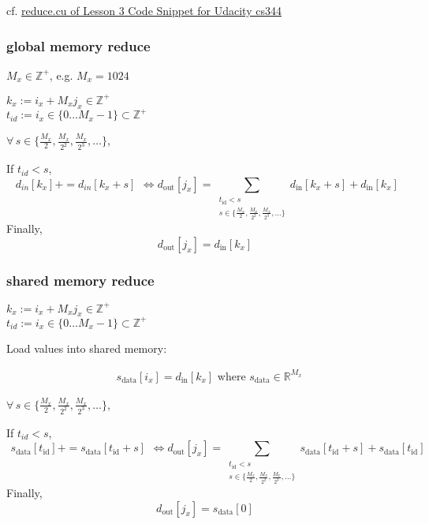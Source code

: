 \documentclass[10pt]{amsart}
\begin{document}
\begin{multicols*}{2}
cf. \href{https://github.com/udacity/cs344/blob/master/Lesson Code Snippets/Lesson 3 Code Snippets/reduce.cu}{reduce.cu of Lesson 3 Code Snippet for Udacity cs344}


\subsubsection*{global memory reduce}

$M_x \in \mathbb{Z}^+$, e.g. $M_x = 1024$

$k_x := i_x + M_x j_x \in \mathbb{Z}^+$ \\
$t_{id} := i_x \in \lbrace 0 \dots M_x-1\rbrace \subset \mathbb{Z}^+$

$\forall \, s \in \lbrace \frac{M_x}{2}, \frac{M_x}{2^2}, \frac{M_x}{2^3}, \dots \rbrace $, 

If $t_{id} < s$,
\[
\begin{gathered}
d_{in}[k_x] += d_{in}[k_x + s]
\end{gathered} \Longleftrightarrow d_{\text{out}}[j_x] = \sum_{ \substack{ t_{\text{id}} < s \\ s \in \lbrace \frac{M_x}{2}, \frac{M_x}{2^2}, \frac{M_x}{2^3} , \dots \rbrace } } d_{\text{in}}[k_x + s] + d_{\text{in}}[k_x]
\]
Finally,
\[
d_{\text{out}}[j_x] = d_{\text{in}}[k_x]
\]

\subsubsection*{shared memory reduce }

$k_x := i_x + M_x j_x \in \mathbb{Z}^+$ \\
$t_{id} := i_x \in \lbrace 0 \dots M_x-1\rbrace \subset \mathbb{Z}^+$

Load values into shared memory:

\[
\begin{aligned} 
  & s_{\text{data}}[i_x] = d_{\text{in}}[k_x]  \text{ where }  s_{\text{data}}  \in \mathbb{R}^{M_x} 
 \end{aligned}
\]

$\forall \, s \in \lbrace \frac{M_x}{2}, \frac{M_x}{2^2}, \frac{M_x}{2^3}, \dots \rbrace $, 

If $t_{id} < s$,
\[
\begin{gathered}
s_{\text{data}}[t_{\text{id}}] += s_{\text{data}}[t_{\text{id}} + s]
\end{gathered} \Longleftrightarrow d_{\text{out}}[j_x] = \sum_{ \substack{ t_{\text{id}} < s \\ s \in \lbrace \frac{M_x}{2}, \frac{M_x}{2^2}, \frac{M_x}{2^3} , \dots \rbrace } } s_{\text{data}}[t_{\text{id}} + s] + s_{\text{data}}[t_{\text{id}}]
\]
Finally,
\[
d_{\text{out}}[j_x] = s_{\text{data}}[0]
\]



\end{multicols*}
\end{document}

